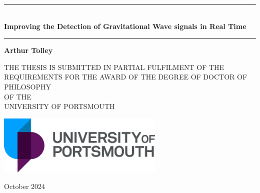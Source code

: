 \begin{titlepage}
   \begin{center}

        \vspace*{2cm}

   
        \rule{\textwidth}{0.4pt}\\
        \vspace{0.4cm}
        \Huge \textbf{Improving the Detection of Gravitational Wave signals in Real Time}
        \rule{\textwidth}{0.4pt}

        \vspace{1.0cm}
        \textbf{Arthur Tolley}

        \vspace{1.5cm}
            
        {\large THE THESIS IS SUBMITTED IN PARTIAL FULFILMENT OF THE REQUIREMENTS FOR THE AWARD OF THE DEGREE OF DOCTOR OF PHILOSOPHY}\\
        {\large OF THE}\\
        {\large UNIVERSITY OF PORTSMOUTH}

        \vspace{3.0cm}
     
       \includegraphics[width=0.6\textwidth]{images/UoP_Logo.pdf}
            
        \large October 2024
            
   \end{center}
\end{titlepage}